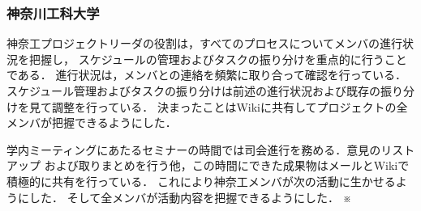 \subsubsection{神奈川工科大学}
\par 神奈工プロジェクトリーダの役割は，すべてのプロセスについてメンバの進行状況を把握し，
スケジュールの管理およびタスクの振り分けを重点的に行うことである．
進行状況は，メンバとの連絡を頻繁に取り合って確認を行っている．
スケジュール管理およびタスクの振り分けは前述の進行状況および既存の振り分けを見て調整を行っている．
決まったことはWikiに共有してプロジェクトの全メンバが把握できるようにした．
\par 学内ミーティングにあたるセミナーの時間では司会進行を務める．意見のリストアップ
および取りまとめを行う他，この時間にできた成果物はメールとWikiで積極的に共有を行っている．
これにより神奈工メンバが次の活動に生かせるようにした．
そして全メンバが活動内容を把握できるようにした．
※
